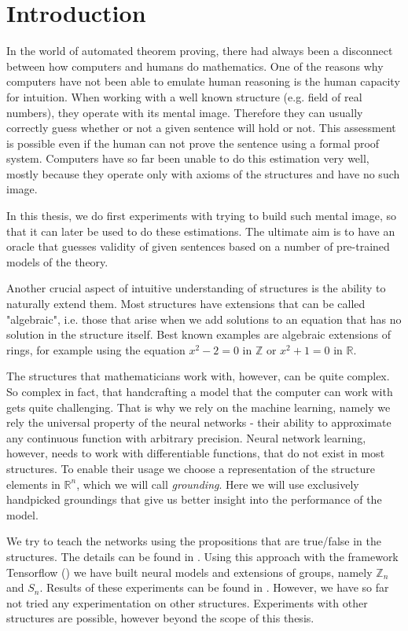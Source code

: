 \chapter*{Introduction}
\label{intro}

In the world of automated theorem proving, there had always been a disconnect between how computers and humans do mathematics. One of the reasons why computers have not been able to emulate human reasoning is the human capacity for intuition. When working with a well known structure (e.g. field of real numbers), they operate with its mental image. Therefore they can usually correctly guess whether or not a given sentence will hold or not. This assessment is possible even if the human can not prove the sentence using a formal proof system. Computers have so far been unable to do this estimation very well, mostly because they operate only with axioms of the structures and have no such image.

In this thesis, we do first experiments with trying to build such mental image, so that it can later be used to do these estimations. The ultimate aim is to have an oracle that guesses validity of given sentences based on a number of pre-trained models of the theory. 

Another crucial aspect of intuitive understanding of structures is the ability to naturally extend them. Most structures have extensions that can be called "algebraic", i.e. those that arise when we add solutions to an equation that has no solution in the structure itself. Best known examples are algebraic extensions of rings, for example using the equation $x^2-2=0$ in $\mathbb{Z}$ or $x^2+1=0$ in $\mathbb{R}$.

The structures that mathematicians work with, however, can be quite complex. So complex in fact, that handcrafting a model that the computer can work with gets quite challenging. That is why we rely on the machine learning, namely we rely the universal property of the neural networks - their ability to approximate any continuous function with arbitrary precision. Neural network learning, however, needs to work with differentiable functions, that do not exist in most structures. To enable their usage we choose a representation of the structure elements in $\mathbb{R}^n$, which we will call \textit{grounding}. Here we will use exclusively handpicked groundings that give us better insight into the performance of the model.

We try to teach the networks using the propositions that are true/false in the structures. The details can be found in . Using this approach with the framework Tensorflow (\cite{tf}) we have built neural models and extensions of groups, namely $\mathbb{Z}_n$ and $S_n$. Results of these experiments can be found in . However, we have so far not tried any experimentation on other structures. Experiments with other structures are possible, however beyond the scope of this thesis. 